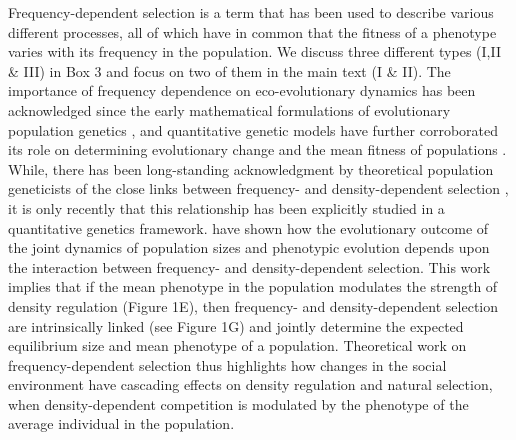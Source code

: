 \documentclass{article}
\begin{document}
	Frequency-dependent selection is a term that has been used to describe various different processes, all of which have in common that the fitness of a phenotype varies with its frequency in the population. We discuss three different types (I,II & III) in Box 3 and focus on two of them in the main text (I & II). The importance of frequency dependence on eco-evolutionary dynamics has been acknowledged since the early mathematical formulations of evolutionary population genetics \citep{Fisher1930, Wright1948}, and quantitative genetic models have further corroborated its role on determining evolutionary change and the mean fitness of populations \citep{Lande1976, Lande2007, Svensson2018, Engen2020}. While, there has been long-standing acknowledgment by theoretical population geneticists of the close links between frequency- and density-dependent selection \citep{Smouse1976, Anderson1983, Heino1998, Joshi2001}, it is only recently that this relationship has been explicitly studied in a quantitative genetics framework. \cite{Engen2020} have shown how the evolutionary outcome of the joint dynamics of population sizes and phenotypic evolution depends upon the interaction between frequency- and density-dependent selection. This work implies that if the mean phenotype in the population modulates the strength of density regulation (Figure 1E), then frequency- and density-dependent selection are  intrinsically linked (see Figure 1G) and jointly determine the expected equilibrium size and mean phenotype of a population. Theoretical work on frequency-dependent selection thus highlights how changes in the social environment have cascading effects on density regulation and natural selection, when density-dependent competition is modulated by the phenotype of the average individual in the population. 
	
\end{document}

